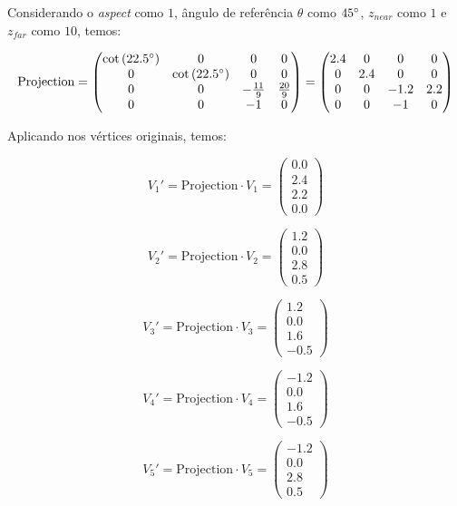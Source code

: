 \documentclass{article}
\begin{document}
Considerando o \textit{aspect} como $1$, ângulo  de referência $\theta$ como $45\degree$, $z_{near}$ como $1$ e $z_{far}$ como $10$, temos:

$$\text{Projection} = \begin{pmatrix}
\cot{(22.5 \degree)} & 0 & 0 & 0\\
0 & \cot{(22.5 \degree)} & 0 & 0\\
0 & 0 & -\frac{11}{9} & \frac{20}{9}\\
0 & 0 & -1 & 0
\end{pmatrix} = \begin{pmatrix}
2.4 & 0 & 0 & 0\\
0 & 2.4 & 0 & 0\\
0 & 0 & -1.2 & 2.2\\
0 & 0 & -1 & 0
\end{pmatrix}$$

Aplicando nos vértices originais, temos:

$$V_1' = \text{Projection} \cdot V_1 = \begin{pmatrix}
	0.0 \\
	2.4 \\
	2.2 \\
	0.0 
\end{pmatrix}$$

$$V_2' = \text{Projection} \cdot V_2 = \begin{pmatrix}
	1.2 \\
	0.0 \\
	2.8 \\
	0.5 
\end{pmatrix}$$

$$V_3' = \text{Projection} \cdot V_3 = \begin{pmatrix}
	1.2 \\
	0.0 \\
	1.6 \\
	-0.5 
\end{pmatrix}$$

$$V_4' = \text{Projection} \cdot V_4 = \begin{pmatrix}
	-1.2 \\
	0.0 \\
	1.6 \\
	-0.5 
\end{pmatrix}$$

$$V_5' = \text{Projection} \cdot V_5 = \begin{pmatrix}
	-1.2 \\
	0.0 \\
	2.8 \\
	0.5 
\end{pmatrix}$$
\end{document}
